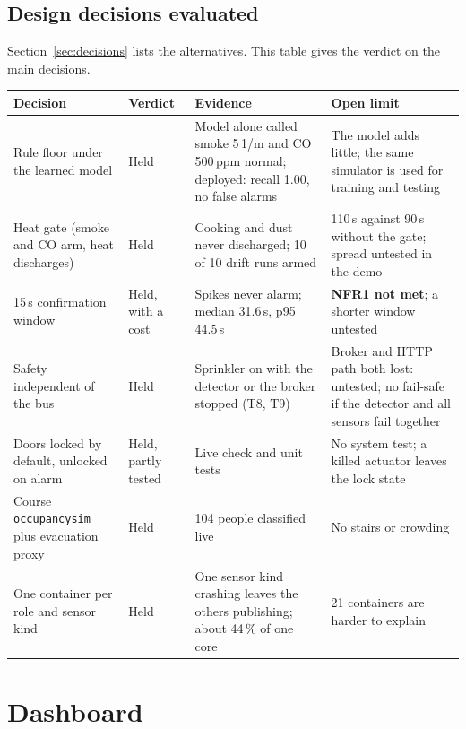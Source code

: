 \documentclass[11pt]{article}
\newcommand{\code}[1]{\texttt{#1}}
\begin{document}
\subsection{Design decisions evaluated}\label{sec:decisions-eval}
Section~\ref{sec:decisions} lists the alternatives. This table gives the verdict on the main decisions.

{\setlength{\extrarowheight}{1pt}\begin{longtable}{@{}L{3.3cm}L{1.9cm}L{5.4cm}L{4.5cm}@{}}
\toprule
Decision & Verdict & Evidence & Open limit\\
\midrule\endhead
Rule floor under the learned model & Held & Model alone called smoke 5\,1/m and CO 500\,ppm normal; deployed: recall 1.00, no false alarms & The model adds little; the same simulator is used for training and testing\\
Heat gate (smoke and CO arm, heat discharges) & Held & Cooking and dust never discharged; 10 of 10 drift runs armed & 110\,s against 90\,s without the gate; spread untested in the demo\\
15\,s confirmation window & Held, with a cost & Spikes never alarm; median 31.6\,s, p95 44.5\,s & \textbf{NFR1 not met}; a shorter window untested\\
Safety independent of the bus & Held & Sprinkler on with the detector or the broker stopped (T8, T9) & Broker and HTTP path both lost: untested; no fail-safe if the detector and all sensors fail together\\
Doors locked by default, unlocked on alarm & Held, partly tested & Live check and unit tests & No system test; a killed actuator leaves the lock state\\
Course \code{occupancysim} plus evacuation proxy & Held & 104 people classified live & No stairs or crowding\\
One container per role and sensor kind & Held & One sensor kind crashing leaves the others publishing; about 44\,\% of one core & 21 containers are harder to explain\\
\bottomrule
\end{longtable}}

\section{Dashboard}\label{sec:dashboard}
\end{document}
